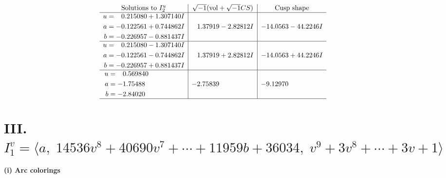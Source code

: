 \documentclass[1p]{elsarticle_modified}
\theoremstyle{definition}
\newcommand{\I}{\sqrt{-1}}
\begin{document}
$$\begin{array}{c|c|c}  
\text{Solutions to }I^u_{2}& \I (\text{vol} + \sqrt{-1}CS) & \text{Cusp shape}\\
 \hline 
\begin{aligned}
u &= \phantom{-}0.215080 + 1.307140 I \\
a &= -0.122561 + 0.744862 I \\
b &= -0.226957 - 0.881437 I\end{aligned}
 & \phantom{-}1.37919 - 2.82812 I & -14.0563 - 44.2246 I \\ \hline\begin{aligned}
u &= \phantom{-}0.215080 - 1.307140 I \\
a &= -0.122561 - 0.744862 I \\
b &= -0.226957 + 0.881437 I\end{aligned}
 & \phantom{-}1.37919 + 2.82812 I & -14.0563 + 44.2246 I \\ \hline\begin{aligned}
u &= \phantom{-}0.569840\phantom{ +0.000000I} \\
a &= -1.75488\phantom{ +0.000000I} \\
b &= -2.84020\phantom{ +0.000000I}\end{aligned}
 & -2.75839\phantom{ +0.000000I} & -9.12970\phantom{ +0.000000I}\\
 \hline 
 \end{array}$$\newpage\newpage\renewcommand{\arraystretch}{1}
\centering \section*{III. $I^v_{1}= \langle a,\;14536 v^8+40690 v^7+\cdots+11959 b+36034,\;v^9+3 v^8+\cdots+3 v+1 \rangle$}
\flushleft \textbf{(i) Arc colorings}\\
\end{document}
